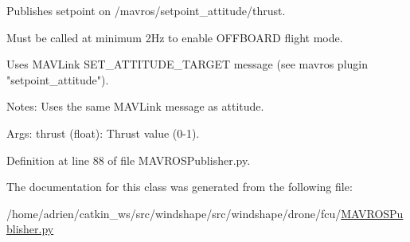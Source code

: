\begin{DoxyVerb}Publishes setpoint on /mavros/setpoint_attitude/thrust.
 
Must be called at minimum 2Hz to enable OFFBOARD flight mode.

Uses MAVLink SET_ATTITUDE_TARGET message (see mavros plugin
"setpoint_attitude").

Notes:
    Uses the same MAVLink message as attitude.

Args:
    thrust (float): Thrust value (0-1).
\end{DoxyVerb}
 

Definition at line 88 of file M\+A\+V\+R\+O\+S\+Publisher.\+py.



The documentation for this class was generated from the following file\+:\begin{DoxyCompactItemize}
\item 
/home/adrien/catkin\+\_\+ws/src/windshape/src/windshape/drone/fcu/\mbox{\hyperlink{_m_a_v_r_o_s_publisher_8py}{M\+A\+V\+R\+O\+S\+Publisher.\+py}}\end{DoxyCompactItemize}
